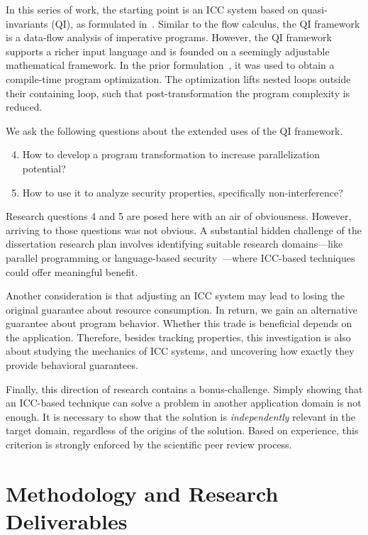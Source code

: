 In this series of work, the starting point is an ICC system based on
quasi-invariants (QI), as formulated in~\cite{moyen20172}. Similar to the flow
calculus, the QI framework is a data-flow analysis of imperative programs.
However, the QI framework supports a richer input language and is founded on a
seemingly adjustable mathematical framework. In the prior
formulation~\cite{moyen20172}, it was used to obtain a compile-time program
optimization. The optimization lifts nested loops outside their containing loop,
such that post-transformation the program complexity is reduced.

We ask the following questions about the extended uses of the QI framework.
\begin{enumerate}[label={(RQ\arabic*)},leftmargin=*,labelindent=1em]
\setcounter{enumi}{3}
\item How to develop a program transformation to increase parallelization potential?
\item How to use it to analyze security properties, specifically non-interference?
\end{enumerate}
Research questions 4 and 5 are posed here with an air of obviousness. However,
arriving to those questions was not obvious. A substantial hidden challenge of
the dissertation research plan involves identifying suitable research
domains---like parallel programming or language-based
security~\cite{sabelfeld2003}---where ICC-based techniques could offer
meaningful benefit.

Another consideration is that adjusting an ICC system may lead to losing the
original guarantee about resource consumption. In return, we gain an alternative
guarantee about program behavior. Whether this trade is beneficial depends on
the application. Therefore, besides tracking properties, this investigation is
also about studying the mechanics of ICC systems, and uncovering how exactly
they provide behavioral guarantees.

Finally, this direction of research contains a bonus\hyp{}challenge. Simply
showing that an ICC-based technique can solve a problem in another application
domain is not enough. It is necessary to show that the solution is
\emph{independently} relevant in the target domain, regardless of the origins of
the solution. Based on experience, this criterion is strongly enforced by the
scientific peer review process.

\section{Methodology and Research Deliverables}
\label{sec:aicc-methods}

